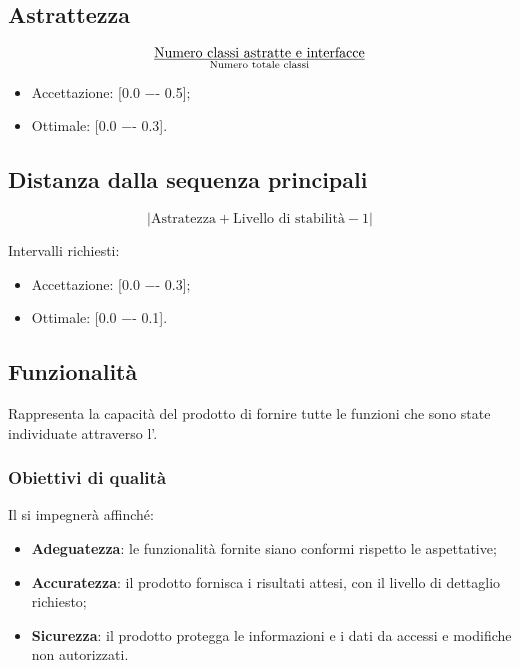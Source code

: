 \subsection{Astrattezza}

\begin{displaymath}
{\text{Numero classi astratte e interfacce}}\over{\text{Numero totale classi}}
\end{displaymath}

\begin{itemize}
\item
Accettazione: [0.0 −- 0.5];
\item
Ottimale: [0.0 −- 0.3].
\end{itemize}

\subsection{Distanza dalla sequenza principali}

\begin{displaymath}
{|\text{Astratezza} + \text{Livello di stabilità} - 1|}
\end{displaymath}

Intervalli richiesti:
\begin{itemize}
\item
Accettazione: [0.0 −- 0.3];
\item
Ottimale: [0.0 −- 0.1].
\end{itemize}


\subsection{Funzionalità}
Rappresenta la capacità del prodotto di fornire tutte le funzioni che sono state individuate attraverso l'\AdR.

\subsubsection{Obiettivi di qualità}
Il  si impegnerà affinché:
\begin{itemize}
\item \textbf{Adeguatezza}: le funzionalità fornite siano conformi rispetto le aspettative;
\item \textbf{Accuratezza}: il prodotto fornisca i risultati attesi, con il livello di dettaglio richiesto;
\item \textbf{Sicurezza}: il prodotto protegga le informazioni e i dati da accessi e modifiche non autorizzati.
\end{itemize}

